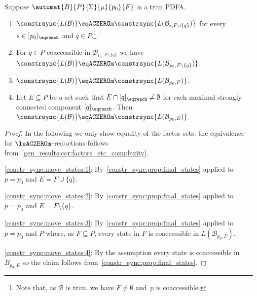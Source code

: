 \begin{corollary}
	\label{constr_sync:move_states}
	Suppose $\automat{B}{P}{\Sigma}{\mu}{p_0}{F}$
	is a trim PDFA.
	\begin{enumerate} 		
		\item \label{constr_sync:move_states:1} $\constrsync{L(\mathcal B)} \eqACZEROm 
		\constrsync{L(\mathcal B_{s, F \cup \{q\}})}$
		for every $s \in [p_0]_{\eqreach}$
		and $q \in P$.\footnote{Note that, as $\mathcal B$ is trim, we have $F \ne \emptyset$ and~$p$ is coaccessible.}
		
		
		\item \label{constr_sync:move_states:2} For $q \in P$ coaccessible in $\mathcal B_{p_0, F\setminus\{q\}}$ 
		we have $\constrsync{L(\mathcal B)} \eqACZEROm 
		\constrsync{L(\mathcal B_{p_0, F \setminus \{q\}})}$.	
		
		\item \label{constr_sync:move_states:3} $\constrsync{L(\mathcal B)} \eqACZEROm  \constrsync{L(\mathcal B_{p_0, P})}$.
		
		\item \label{constr_sync:move_states:4} Let $E \subseteq P$ be a set such that $E \cap [q]_{\eqreach} \ne \emptyset$ for each
		maximal strongly connected component $[q]_{\eqreach}$.
		Then $\constrsync{L(\mathcal B)} \eqACZEROm 
		\constrsync{L(\mathcal B_{p_0, E})}$.
		
	\end{enumerate} 
\end{corollary}
\begin{proof} In the following we only show equality of the factor sets,
	the equivalence for $\leACZEROm$-reductions follows from~\cref{gen_results:cor:factors_etc_complexity}.	
		
\ref{constr_sync:move_states:1}: By~\cref{constr_sync:prop:final_states} applied to $p = p_0$
	and $E = F \cup \{q\}$.	
	
\ref{constr_sync:move_states:2}:   By~\cref{constr_sync:prop:final_states} applied to $p = p_0$	and $E = F \setminus \{q\}$.
	
	
\ref{constr_sync:move_states:3}:  By~\cref{constr_sync:prop:final_states} applied to $p = p_0$
	and $P$ where, as $F \subseteq P$, every state in $F$ is coaccessible in $L(\mathcal B_{p_0, P})$.
	
\ref{constr_sync:move_states:4}: By the assumption
 every state is coaccessible in $B_{p_0, E}$
 so the claim follows from~\cref{constr_sync:prop:final_states}.
\end{proof}

